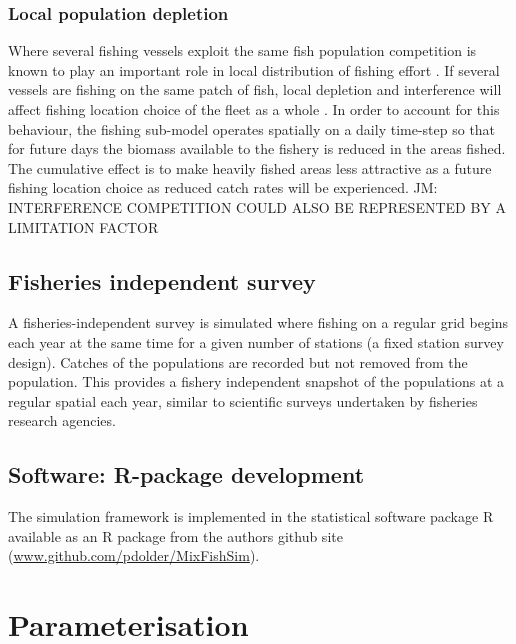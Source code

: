 \documentclass[review]{elsarticle}
\begin{document}
\subsubsection{Local population depletion}

Where several fishing vessels exploit the same fish population competition is
known to play an important role in local distribution of fishing effort
\citep{Gillis1998}. If several vessels are fishing on the same patch of fish,
local depletion and interference  will affect fishing
location choice of the fleet as a whole \citep{Rijnsdorp2000, Poos2007a}. In
order to account for this behaviour, the fishing sub-model operates spatially
on a daily time-step so that for future days the biomass available to the
fishery is reduced in the areas fished. The cumulative effect is to make
heavily fished areas less attractive as a future fishing location choice as
reduced catch rates will be experienced. JM: INTERFERENCE COMPETITION COULD
ALSO BE REPRESENTED BY A LIMITATION FACTOR 

\subsection{Fisheries independent survey}

A fisheries-independent survey is simulated where fishing on a regular grid
begins each year at the same time for a given number of stations (a fixed
station survey design). Catches of the populations  are recorded but not removed from the population. This
provides a fishery independent snapshot of the populations at a regular spatial
 each year, similar to scientific
surveys undertaken by fisheries research agencies. \\

\subsection{Software: R-package development}

The simulation framework is implemented in the statistical software package R
\citep{RCoreTeam2017}  available as an R package from
the authors github site (\url{www.github.com/pdolder/MixFishSim}).\\

\section{Parameterisation}
\end{document}
